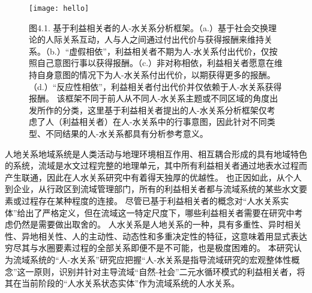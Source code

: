
\begin{figure}[htb] %
    \centering
    \texttt{[image: hello]}
    \caption[基于利益相关者的人-水关系分析框架]{图4.1. 基于利益相关者的人-水关系分析框架。（a.）基于社会交换理论的人际关系互动，人与人之间通过付出代价与获得报酬来维持关系。（b.）“虚假相依”，利益相关者不期为人-水关系付出代价，仅按照自己意图行事以获得报酬。（c.）非对称相依，利益相关者愿意在维持自身意图的情况下为人-水关系付出代价，以期获得更多的报酬。（d.）“反应性相依”，利益相关者付出代价并仅依赖于人-水关系获得报酬。
    该框架不同于前人从不同人-水关系主题或不同区域的角度出发所作的分类，这里基于利益相关者提出的人-水关系分析框架仅考虑了人（利益相关者）在人-水关系中的行事意图，因此针对不同类型、不同结果的人-水关系都具有分析参考意义。}\label{ch2:fig:reaction}
\end{figure}



人地关系地域系统是人类活动与地理环境相互作用、相互耦合形成的具有地域特色的系统\cite{tan2021}，流域是水文过程完整的地理单元，其中所有利益相关者通过地表水过程而产生联通，因此在人水关系研究中有着得天独厚的优越性。
也正因如此，从个人到企业，从行政区到流域管理部门，所有的利益相关者都与流域系统的某些水文要素或过程存在某种程度的连接。
尽管已基于利益相关者的概念对“人水关系实体”给出了严格定义，但在流域这一特定尺度下，哪些利益相关者需要在研究中考虑仍然是需要做出取舍的。
人水关系是人地关系的一种，具有多重性、异时相关性、异地相关性、人的主动性、动态性和多重决定性的特征\cite{fang2004}，这意味着用显式表达穷尽其与水圈要素过程的全部关系即便不是不可能，也是极度困难的。
本研究认为流域系统的“人-水关系”研究应把握“人-水关系是指导流域研究的宏观整体性概念”这一原则，识别并针对主导流域“自然-社会”二元水循环模式的利益相关者，将其在当前阶段的“人水关系状态实体”作为流域系统的人水关系。


